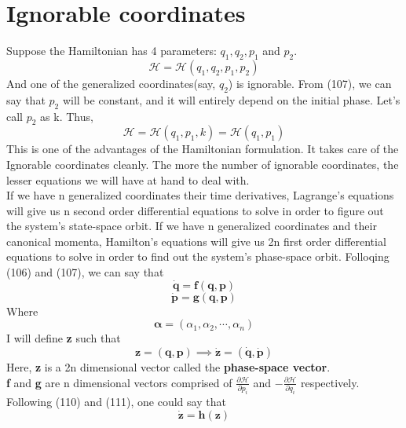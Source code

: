 \documentclass[12pt]{article}
\begin{document}
    \section{Ignorable coordinates}
    Suppose the Hamiltonian has 4 parameters: $q_1,q_2,p_1$ and $p_2$.
    \begin{equation}
        \mathcal{H}=\mathcal{H}(q_1,q_2,p_1,p_2)
    \end{equation}
    And one of the generalized coordinates(say, $q_2$) is ignorable. From (107), we can say that $p_2$ will be constant, and it will entirely depend on the initial phase. Let's call $p_2$ as k.
    Thus,
    \begin{equation}
        \mathcal{H}=\mathcal{H}(q_1,p_1,k)=\mathcal{H}(q_1,p_1)
    \end{equation}
    This is one of the advantages of the Hamiltonian formulation. It takes care of the Ignorable coordinates cleanly. The more the number of ignorable coordinates, the lesser equations we will have at hand to deal with.
    \\ If we have n generalized coordinates their time derivatives, Lagrange's equations will give us n second order differential equations to solve in order to figure out the system's state-space orbit.
    If we have n generalized coordinates and their canonical momenta, Hamilton's equations will give us 2n first order differential equations to solve in order to find out the system's phase-space orbit.
    Folloqing (106) and (107), we can say that
    \begin{equation}
        \mathbf{\dot{q}}=\mathbf{f}(\mathbf{q},\mathbf{p})
    \end{equation}
    \begin{equation}
        \mathbf{\dot{p}}=\mathbf{g}(\mathbf{q},\mathbf{p})
    \end{equation}
    Where
    \begin{equation}
        \mathbf{\mathbf{\mathbf{\alpha}}}=(\alpha_1,\alpha_2,\cdots,\alpha_n)
    \end{equation}
    I will define \textbf{z} such that
    \begin{equation}
        \mathbf{z}=(\mathbf{q},\mathbf{p}) \implies \mathbf{\dot{z}}=(\mathbf{\dot{q}},\mathbf{\dot{p}})
    \end{equation}
    Here, \textbf{z} is a 2n dimensional vector called the \textbf{phase-space vector}.
    \\ \textbf{f} and \textbf{g} are n dimensional vectors comprised of $\frac{\partial \mathcal{H}}{\partial p_i}$ and $-\frac{\partial \mathcal{H}}{\partial q_i}$ respectively.
    \\ Following (110) and (111), one could say that
    \begin{equation}
        \mathbf{\dot{z}}=\mathbf{h}(\mathbf{z})
    \end{equation}
\end{document}
